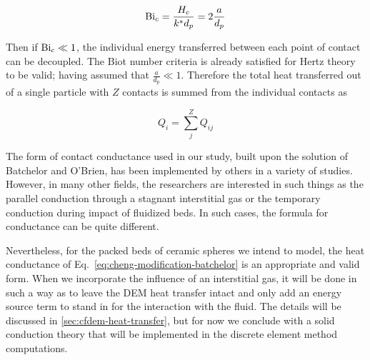 \begin{equation}
	\mathrm{Bi}_c = \frac{H_c}{k^* d_p} = 2\frac{a}{d_p}
\end{equation}

Then if $\mathrm{Bi}_c \ll 1$, the individual energy transferred between each point of contact can be decoupled. The Biot number criteria is already satisfied for Hertz theory to be valid; having assumed that $\frac{a}{d_p} \ll 1$. Therefore the total heat transferred out of a single particle with $Z$ contacts is summed from the individual contacts as 

\begin{equation}
	Q_i = \sum_j^Z Q_{ij}
\end{equation}

The form of contact conductance used in our study, built upon the solution of Batchelor and O'Brien\cite{Batchelor1977}, has been implemented by others in a variety of studies\cite{Vargas2001, Chaudhuri2006, Zhou2009,Cheng19994199}. However, in many other fields, the researchers are interested in such things as the parallel conduction through a stagnant interstitial gas\cite{Bu2013} or the temporary conduction during impact of fluidized beds\cite{Zhu2008,Zhang2011,Wu2011,Li2000}. In such cases, the formula for conductance can be quite different.

Nevertheless, for the packed beds of ceramic spheres we intend to model, the heat conductance of Eq.~\ref{eq:cheng-modification-batchelor} is an appropriate and valid form. When we incorporate the influence of an interstitial gas, it will be done in such a way as to leave the DEM heat transfer intact and only add an energy source term to stand in for the interaction with the fluid. The details will be discussed in \cref{sec:cfdem-heat-transfer}, but for now we conclude with a solid conduction theory that will be implemented in the discrete element method computations.